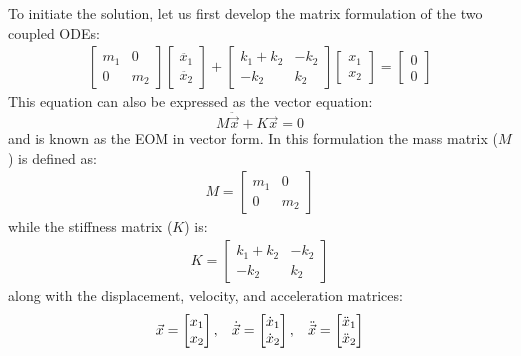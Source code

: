 \documentclass[12pt,letter]{article}
\numberwithin{ex}{section} %
\numberwithin{re}{section} %
\begin{document}
To initiate the solution, let us first develop the matrix formulation of the two coupled ODEs:
\begin{eqnarray}
  \begin{bmatrix} m_1 & 0  \\  0 & m_2 \end{bmatrix}\begin{bmatrix} \ddot{x_1} \\  \ddot{x_2} \end{bmatrix} + \begin{bmatrix} k_1+k_2 & -k_2  \\  -k_2 & k_2 \end{bmatrix}\begin{bmatrix} x_1 \\  x_2 \end{bmatrix} = \begin{bmatrix} 0 \\  0 \end{bmatrix}
\end{eqnarray}
This equation can also be expressed as the vector equation:
\begin{equation}
M\ddot{\vec{x}} + K\vec{x} =0
\end{equation}
and is known as the EOM in vector form. In this formulation the mass matrix ($M$) is defined as:
\begin{eqnarray}
 M=  \begin{bmatrix} m_1 & 0  \\  0 & m_2 \end{bmatrix}  
\end{eqnarray}
while the stiffness matrix ($K$) is:
\begin{eqnarray}
 K=  \begin{bmatrix} k_1+k_2 & -k_2  \\  -k_2 & k_2 \end{bmatrix}
\end{eqnarray}
along with the displacement, velocity, and acceleration matrices:
\begin{eqnarray}
 \vec{x}=  \begin{bmatrix} x_1 \\  x_2 \end{bmatrix} , \hspace{2ex} \dot{\vec{x}}=  \begin{bmatrix} \dot{x}_1 \\  \dot{x}_2 \end{bmatrix}, \hspace{2ex} \ddot{\vec{x}}=  \begin{bmatrix} \ddot{x}_1 \\  \ddot{x}_2 \end{bmatrix}
\end{eqnarray}
\end{document}
